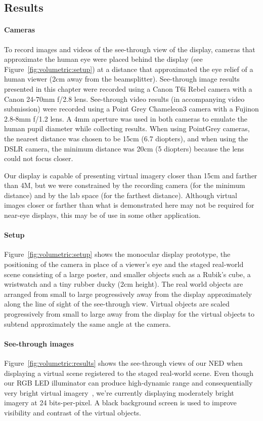 
\subsection{Results}
\label{sec:volumetric:results}
\paragraph{Cameras}
To record images and videos of the see-through view of the display, cameras that approximate the human eye were placed behind the display (see Figure~\ref{fig:volumetric:setup}) at a distance that approximated the eye relief of a human viewer (2cm away from the beamsplitter). See-through image results presented in this chapter were recorded using a Canon T6i Rebel camera with a Canon 24-70mm f/2.8 lens. See-through video results (in accompanying video submission) were recorded using a Point Grey Chameleon3 camera with a Fujinon 2.8-8mm f/1.2 lens. A 4mm aperture was used in both cameras to emulate the human pupil diameter while collecting results. When using PointGrey cameras, the nearest distance was chosen to be 15cm (6.7 diopters), and when using the DSLR camera, the minimum distance was 20cm (5 diopters) because the lens could not focus closer. 

Our display is capable of presenting virtual imagery closer than 15cm and farther than 4M, but we were constrained by the recording camera (for the minimum distance) and by the lab space (for the farthest distance). Although virtual images closer or farther than what is demonstrated here may not be required for near-eye displays, this may be of use in some other application.

\paragraph{Setup}
Figure~\ref{fig:volumetric:setup} shows the monocular display prototype, the positioning of the camera in place of a viewer's eye and the staged real-world scene consisting of a large poster, and smaller objects such as a Rubik's cube, a wristwatch and a tiny rubber ducky (2cm height). The real world objects are arranged from small to large progressively away from the display approximately along the line of sight of the see-through view. Virtual objects are scaled progressively from small to large away from the display for the virtual objects to subtend approximately the same angle at the camera. 

\paragraph{See-through images}
Figure~\ref{fig:volumetric:results} shows the see-through views of our NED when displaying a virtual scene registered to the staged real-world scene. Even though our RGB LED illuminator can produce high-dynamic range and consequentially very bright virtual imagery~\cite{Lincoln2017scene}, we're currently displaying moderately bright imagery at 24 bits-per-pixel. A black background screen is used to improve visibility and contrast of the virtual objects.

